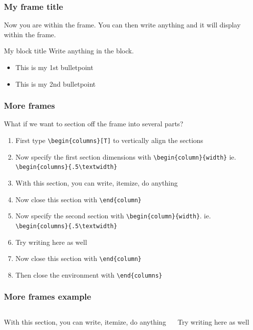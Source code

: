 \documentclass[nogin]{beamer}\usepackage[]{graphicx}\usepackage[]{color}
\begin{document}
\begin{frame}[fragile]
\frametitle{My frame title}
Now you are within the frame. You can then write anything and it will display within the frame.
\begin{block}{My block title}
Write anything in the block.
\begin{itemize}
\item This is my 1st bulletpoint
\item This is my 2nd bulletpoint
\end{itemize}
\end{block}
\end{frame}

\begin{frame}[fragile]
\frametitle{More frames}
\footnotesize
What if we want to section off the frame into several parts?
\scriptsize
\begin{enumerate}
\item First type \verb|\begin{columns}[T]| to vertically align the sections
\item Now specify the first section dimensions  with \verb|\begin{column}{width}| ie. \verb|\begin{columns}{.5\textwidth}|
\item With this section, you can write, itemize, do anything
\item Now close this section with \verb|\end{column}|
\item Now specify the second section with \verb|\begin{column}{width}|. ie. \verb|\begin{columns}{.5\textwidth}|
\item Try writing here as well
\item Now close this section with \verb|\end{column}|
\item Then close the environment with \verb|\end{columns}|
\end{enumerate}
\end{frame}

\begin{frame}
\frametitle{More frames example}
\begin{columns}[T]
\begin{column}{.5\textwidth}
With this section, you can write, itemize, do anything
\end{column}
\begin{column}{.5\textwidth}
Try writing here as well
\end{column}
\end{columns}
\end{frame}
\end{document}
